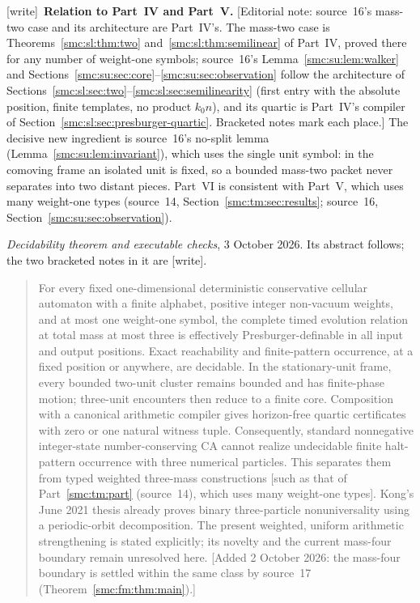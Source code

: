\documentclass[11pt,letterpaper]{article}
\numberwithin{equation}{section}
\theoremstyle{definition}
\theoremstyle{remark}
\newcommand{\wtag}{\textup{[write]}}
\begin{document}
\wtag\ \textbf{Relation to Part~IV and Part~V.} [Editorial note: source~16's mass-two case and its architecture are Part~IV's. The mass-two case is Theorems~\ref{smc:sl:thm:two} and~\ref{smc:sl:thm:semilinear} of Part~IV, proved there for any number of weight-one symbols; source~16's Lemma~\ref{smc:su:lem:walker} and Sections~\ref{smc:su:sec:core}--\ref{smc:su:sec:observation} follow the architecture of Sections~\ref{smc:sl:sec:two}--\ref{smc:sl:sec:semilinearity} (first entry with the absolute position, finite templates, no product $k_0n$), and its quartic is Part~IV's compiler of Section~\ref{smc:sl:sec:presburger-quartic}. Bracketed notes mark each place.] The decisive new ingredient is source~16's no-split lemma (Lemma~\ref{smc:su:lem:invariant}), which uses the single unit symbol: in the comoving frame an isolated unit is fixed, so a bounded mass-two packet never separates into two distant pieces. Part~VI is consistent with Part~V, which uses many weight-one types (source~14, Section~\ref{smc:tm:sec:results}; source~16, Section~\ref{smc:su:sec:observation}).

\bigskip
{}
\par
\noindent\emph{Decidability theorem and executable checks}, 3 October 2026. Its abstract follows; the two bracketed notes in it are \wtag.
\begin{quote}\small
For every fixed one-dimensional deterministic conservative cellular automaton
with a finite alphabet, positive integer non-vacuum weights, and at most one
weight-one symbol, the complete timed evolution relation at total mass at most
three is effectively Presburger-definable in all input and output positions.
Exact reachability and finite-pattern occurrence, at a fixed position or
anywhere, are decidable. In the stationary-unit frame, every bounded two-unit
cluster remains bounded and has finite-phase motion; three-unit encounters
then reduce to a finite core. Composition with a canonical arithmetic compiler
gives horizon-free quartic certificates with zero or one natural witness tuple.
Consequently, standard nonnegative integer-state number-conserving CA cannot
realize undecidable finite halt-pattern occurrence with three numerical
particles. This separates them from typed weighted three-mass constructions [such as that of Part~\ref{smc:tm:part} (source~14), which uses many weight-one types].
Kong's June 2021 thesis already proves binary three-particle nonuniversality
using a periodic-orbit decomposition. The present weighted, uniform arithmetic
strengthening is stated explicitly; its novelty and the current mass-four
boundary remain unresolved here. [Added 2 October 2026: the mass-four boundary is settled within the same class by source~17 (Theorem~\ref{smc:fm:thm:main}).]
\end{quote}
\end{document}
